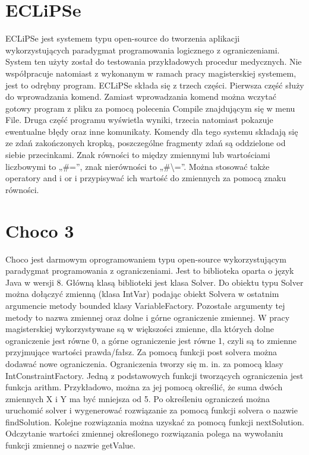 \documentclass[oneside,a4paper]{book}
\begin{document}
\begin{spacing}{1.5}
\section{ECLiPSe}

ECLiPSe\cite{EclipseSite} jest systemem typu open-source do tworzenia aplikacji wykorzystujących paradygmat programowania logicznego z ograniczeniami. System ten użyty został do testowania przykładowych procedur medycznych. Nie współpracuje natomiast z wykonanym w ramach pracy magisterskiej systemem, jest to odrębny program. ECLiPSe składa się z trzech części. Pierwsza część służy do wprowadzania komend. Zamiast wprowadzania komend można wczytać gotowy program z pliku za pomocą polecenia Compile znajdującym się w menu File. Druga część programu wyświetla wyniki, trzecia natomiast pokazuje ewentualne błędy oraz inne komunikaty. Komendy dla tego systemu składają się ze zdań zakończonych kropką, poszczególne fragmenty zdań są oddzielone od siebie przecinkami. Znak równości to między zmiennymi lub wartościami liczbowymi to „\#=”, znak nierówności to „\#\textbackslash=”. Można stosować także operatory and i or i przypisywać ich wartość do zmiennych za pomocą znaku równości. 

\section{Choco 3}

Choco\cite{Choco3} jest darmowym oprogramowaniem typu open-source wykorzystującym paradygmat programowania z ograniczeniami. Jest to biblioteka oparta o język Java w wersji 8. Główną klasą biblioteki jest klasa Solver. Do obiektu typu Solver można dołączyć zmienną (klasa IntVar) podając obiekt Solvera w ostatnim argumencie metody bounded klasy VariableFactory. Pozostałe argumenty tej metody to nazwa zmiennej oraz dolne i górne ograniczenie zmiennej. W pracy magisterskiej wykorzystywane są w większości zmienne, dla których dolne ograniczenie jest równe 0, a górne ograniczenie jest równe 1, czyli są to zmienne przyjmujące wartości prawda/fałsz. Za pomocą funkcji post solvera można dodawać nowe ograniczenia. Ograniczenia tworzy się m. in. za pomocą klasy IntConstraintFactory. Jedną z podstawowych funkcji tworzących ograniczenia jest funkcja arithm. Przykładowo, można za jej pomocą określić, że suma dwóch zmiennych X i Y ma być mniejsza od 5. Po określeniu ograniczeń można uruchomić solver i wygenerować rozwiązanie za pomocą funkcji solvera o nazwie findSolution. Kolejne rozwiązania można uzyskać za pomocą funkcji nextSolution. Odczytanie wartości zmiennej określonego rozwiązania polega na wywołaniu funkcji zmiennej o nazwie getValue. 


\end{spacing}
\end{document}
